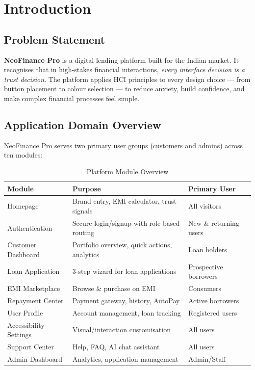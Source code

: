 \documentclass[11pt,a4paper]{article}
\begin{document}
\section{Introduction}

\subsection{Problem Statement}

\textbf{NeoFinance Pro} is a digital lending platform built for the Indian market. It recognises that in high-stakes financial interactions, \textit{every interface decision is a trust decision}. The platform applies HCI principles to every design choice --- from button placement to colour selection --- to reduce anxiety, build confidence, and make complex financial processes feel simple.

\subsection{Application Domain Overview}

NeoFinance Pro serves two primary user groups (customers and admins) across ten modules:

\begin{table}[H]
\caption{Platform Module Overview}
\centering\small
\begin{tabularx}{\textwidth}{l X l}
\toprule
\textbf{Module} & \textbf{Purpose} & \textbf{Primary User} \\
\midrule
\rowcolor{rowalt} Homepage & Brand entry, EMI calculator, trust signals & All visitors \\
Authentication & Secure login/signup with role-based routing & New \& returning users \\
\rowcolor{rowalt} Customer Dashboard & Portfolio overview, quick actions, analytics & Loan holders \\
Loan Application & 3-step wizard for loan applications & Prospective borrowers \\
\rowcolor{rowalt} EMI Marketplace & Browse \& purchase on EMI & Consumers \\
Repayment Center & Payment gateway, history, AutoPay & Active borrowers \\
\rowcolor{rowalt} User Profile & Account management, loan tracking & Registered users \\
Accessibility Settings & Visual/interaction customisation & All users \\
\rowcolor{rowalt} Support Center & Help, FAQ, AI chat assistant & All users \\
Admin Dashboard & Analytics, application management & Admin/Staff \\
\bottomrule
\end{tabularx}
\end{table}
\end{document}
